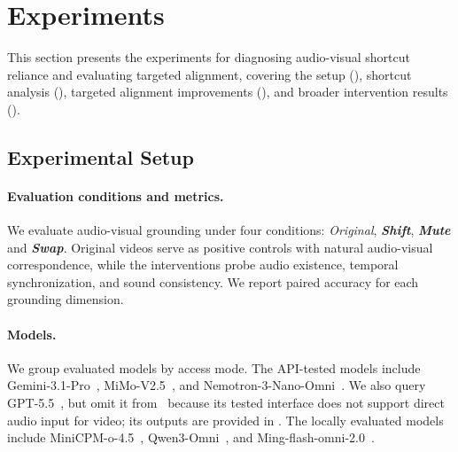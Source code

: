 \documentclass{llmxive}
\providecommand{\shift}{\textbf{\textit{Shift}}\xspace}
\providecommand{\mute}{\textbf{\textit{Mute}}\xspace}
\providecommand{\swap}{\textbf{\textit{Swap}}\xspace}
\begin{document}
\vspace{-4pt}
\section{Experiments}
\label{sec:exp}

This section presents the experiments for diagnosing audio-visual shortcut reliance and evaluating targeted alignment, covering the setup (), shortcut analysis (), targeted alignment improvements (), and broader intervention results ().

\subsection{Experimental Setup}\label{ssec:setup}


\paragraph{Evaluation conditions and metrics.}
We evaluate audio-visual grounding under four conditions: \textit{Original}, \shift, \mute and \swap. Original videos serve as positive controls with natural audio-visual correspondence, while the interventions probe audio existence, temporal synchronization, and sound consistency. We report paired accuracy for each grounding dimension. 







\paragraph{Models.}
We group evaluated models by access mode. The API-tested models include Gemini-3.1-Pro~\cite{deepmind2026gemini3}, MiMo-V2.5~\cite{xiaomi2026mimov25}, and Nemotron-3-Nano-Omni~\cite{Deshmukh2026Nemotron3N}. We also query GPT-5.5~\cite{DBLP:journals/corr/abs-2601-03267}, but omit it from~ because its tested interface does not support direct audio input for video; its outputs are provided in . The locally evaluated models include MiniCPM-o-4.5~\cite{Cui2026MiniCPMo4T}, Qwen3-Omni~\cite{DBLP:journals/corr/abs-2509-17765}, and Ming-flash-omni-2.0~\cite{DBLP:journals/corr/abs-2506-09344}.

\end{document}
